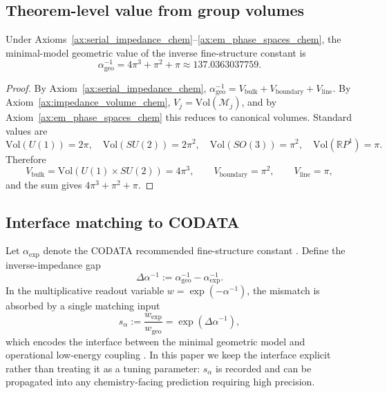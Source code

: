 \subsection{Theorem-level value from group volumes}
\begin{theorem}\label{thm:alpha_three_channel_chem}
Under Axioms~\ref{ax:serial_impedance_chem}--\ref{ax:em_phase_spaces_chem}, the minimal-model geometric value of the inverse fine-structure constant is
\begin{equation}
\alpha_{\mathrm{geo}}^{-1}=4\pi^3+\pi^2+\pi\approx 137.0363037759.
\end{equation}
\end{theorem}
\begin{proof}
By Axiom~\ref{ax:serial_impedance_chem}, $\alpha_{\mathrm{geo}}^{-1}=V_{\mathrm{bulk}}+V_{\mathrm{boundary}}+V_{\mathrm{line}}$. By Axiom~\ref{ax:impedance_volume_chem}, $V_j=\mathrm{Vol}(\mathcal{M}_j)$, and by Axiom~\ref{ax:em_phase_spaces_chem} this reduces to canonical volumes. Standard values \cite{Nakahara2003,Hall2015} are
\begin{equation}
\mathrm{Vol}(U(1))=2\pi,\quad \mathrm{Vol}(SU(2))=2\pi^2,\quad
\mathrm{Vol}(SO(3))=\pi^2,\quad \mathrm{Vol}(\mathbb{R}P^1)=\pi.
\end{equation}
Therefore
\begin{equation}
V_{\mathrm{bulk}}=\mathrm{Vol}(U(1)\times SU(2))=4\pi^3,\qquad
V_{\mathrm{boundary}}=\pi^2,\qquad
V_{\mathrm{line}}=\pi,
\end{equation}
and the sum gives $4\pi^3+\pi^2+\pi$.
\end{proof}

\subsection{Interface matching to CODATA}
Let $\alpha_{\mathrm{exp}}$ denote the CODATA recommended fine-structure constant \cite{CODATA2022RMP}. Define the inverse-impedance gap
\begin{equation}
\Delta\alpha^{-1}:=\alpha_{\mathrm{geo}}^{-1}-\alpha_{\mathrm{exp}}^{-1}.
\end{equation}
In the multiplicative readout variable $w=\exp(-\alpha^{-1})$, the mismatch is absorbed by a single matching input
\begin{equation}
s_\alpha:=\frac{w_{\mathrm{exp}}}{w_{\mathrm{geo}}}=\exp(\Delta\alpha^{-1}),
\end{equation}
which encodes the interface between the minimal geometric model and operational low-energy coupling \cite{Ma2025PCG}. In this paper we keep the interface explicit rather than treating it as a tuning parameter: $s_\alpha$ is recorded and can be propagated into any chemistry-facing prediction requiring high precision.

